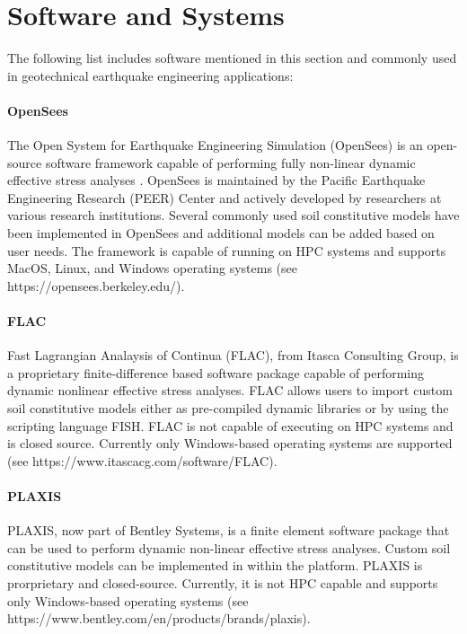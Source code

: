 \section{Software and Systems}
\label{sec:eq_landslide_tools}

The following list includes software mentioned in this section and commonly used in geotechnical earthquake engineering applications:\\

\paragraph{OpenSees}
The Open System for Earthquake Engineering Simulation (OpenSees) is an open-source software framework capable of performing fully non-linear dynamic effective stress analyses \citep{mckenna2011opensees}. OpenSees is maintained by the Pacific Earthquake Engineering Research (PEER) Center and actively developed by researchers at various research institutions. Several commonly used soil constitutive models have been implemented in OpenSees and additional models can be added based on user needs. The framework is capable of running on HPC systems and supports MacOS, Linux, and Windows operating systems (see https://opensees.berkeley.edu/).\\

\paragraph{FLAC}
Fast Lagrangian Analaysis of Continua (FLAC), from Itasca Consulting Group, is a proprietary finite-difference based software package capable of performing dynamic nonlinear effective stress analyses. FLAC allows users to import custom soil constitutive models either as pre-compiled dynamic libraries or by using the scripting language FISH. FLAC is not capable of executing on HPC systems and is closed source. Currently only Windows-based operating systems are supported (see https://www.itascacg.com/software/FLAC).\\

\paragraph{PLAXIS}
PLAXIS, now part of Bentley Systems, is a finite element software package that can be used to perform dynamic non-linear effective stress analyses. Custom soil constitutive models can be implemented in within the platform. PLAXIS is prorprietary and closed-source. Currently, it is not HPC capable and supports only Windows-based operating systems (see https://www.bentley.com/en/products/brands/plaxis).\\

